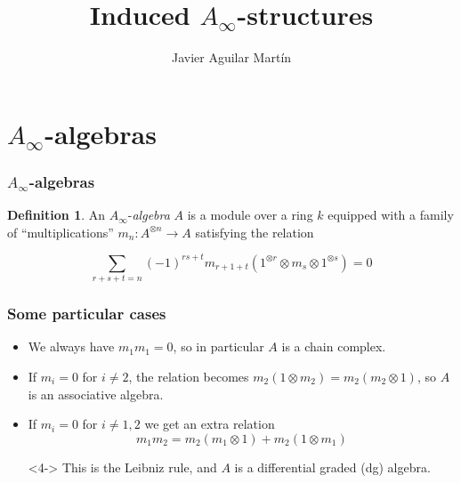 \documentclass{beamer}
\title{Induced $A_\infty$-structures}
\author{Javier Aguilar Mart\'in}
\institute{University of Kent}
\date{}
\theoremstyle{definition}
\newtheorem{defi}{Definition}
\begin{document}
\frame{\titlepage}
%
% 
% 
% 

% 



\newcommand{\seti}{\setcounter{saveenumi}{\value{enumi}}}
\newcommand{\conti}{\setcounter{enumi}{\value{saveenumi}}}

\makeatletter
\makeatother

\section{$A_\infty$-algebras}

\begin{frame}
\frametitle{$A_\infty$-algebras}
\begin{defi}
An $A_\infty$-\emph{algebra} $A$ is a module over a ring $k$ equipped with a family of ``multiplications'' $m_n:A^{\otimes n}\to A$ satisfying the relation

$$\sum_{r+s+t=n}(-1)^{rs+t}m_{r+1+t}(1^{\otimes r}\otimes m_s\otimes 1^{\otimes s})=0$$ %
\end{defi}
\end{frame}





\begin{frame}
\frametitle{Some particular cases}
\begin{itemize}
\item<1-> We always have $m_1m_1=0$, so in particular $A$ is a chain complex.%
\item<2-> If $m_i=0$ for $i\neq 2$, the relation becomes $m_2(1\otimes m_2)=m_2(m_2\otimes 1)$, so $A$ is an associative algebra.
\item<3-> If $m_i=0$ for $i\neq 1,2$ we get an extra relation $$m_1m_2=m_2(m_1\otimes 1)+m_2(1\otimes m_1)$$ %
\item[]<4-> This is the Leibniz rule, and $A$ is a differential graded (dg) algebra.
\end{itemize}
\end{frame}
\end{document}
